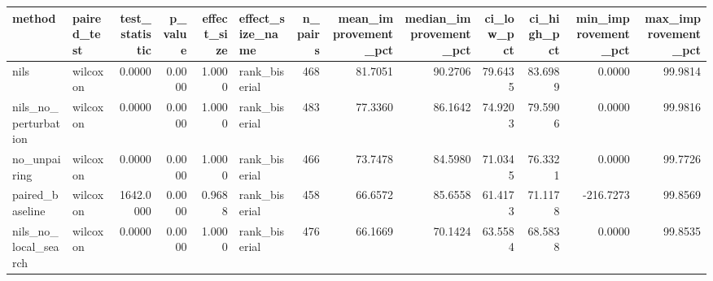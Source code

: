 \begin{tabular}{llrrrlrrrrrrr}
\toprule
method & paired_test & test_statistic & p_value & effect_size & effect_size_name & n_pairs & mean_improvement_pct & median_improvement_pct & ci_low_pct & ci_high_pct & min_improvement_pct & max_improvement_pct \\
\midrule
nils & wilcoxon & 0.0000 & 0.0000 & 1.0000 & rank_biserial & 468 & 81.7051 & 90.2706 & 79.6435 & 83.6989 & 0.0000 & 99.9814 \\
nils_no_perturbation & wilcoxon & 0.0000 & 0.0000 & 1.0000 & rank_biserial & 483 & 77.3360 & 86.1642 & 74.9203 & 79.5906 & 0.0000 & 99.9816 \\
no_unpairing & wilcoxon & 0.0000 & 0.0000 & 1.0000 & rank_biserial & 466 & 73.7478 & 84.5980 & 71.0345 & 76.3321 & 0.0000 & 99.7726 \\
paired_baseline & wilcoxon & 1642.0000 & 0.0000 & 0.9688 & rank_biserial & 458 & 66.6572 & 85.6558 & 61.4173 & 71.1178 & -216.7273 & 99.8569 \\
nils_no_local_search & wilcoxon & 0.0000 & 0.0000 & 1.0000 & rank_biserial & 476 & 66.1669 & 70.1424 & 63.5584 & 68.5838 & 0.0000 & 99.8535 \\
\bottomrule
\end{tabular}
